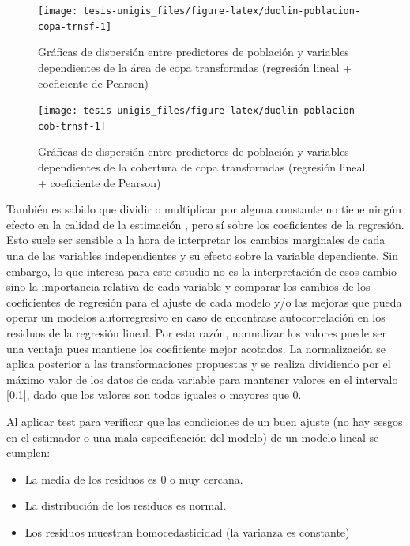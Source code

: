 \documentclass[12pt,]{book}
\providecommand{\tightlist}{%
  \setlength{\itemsep}{0pt}\setlength{\parskip}{0pt}}
\begin{document}
\begin{figure}
\texttt{[image: tesis-unigis\_files/figure-latex/duolin-poblacion-copa-trnsf-1]} \caption{Gráficas de dispersión entre predictores de población y variables dependientes de la área de copa transformdas (regresión lineal + coeficiente de Pearson)}\label{fig:duolin-poblacion-copa-trnsf}
\end{figure}

\begin{figure}
\texttt{[image: tesis-unigis\_files/figure-latex/duolin-poblacion-cob-trnsf-1]} \caption{Gráficas de dispersión entre predictores de población y variables dependientes de la cobertura de copa transformdas (regresión lineal + coeficiente de Pearson)}\label{fig:duolin-poblacion-cob-trnsf}
\end{figure}

También es sabido que dividir o multiplicar por alguna constante no
tiene ningún efecto en la calidad de la estimación , pero sí sobre los
coeficientes de la regresión. Esto suele ser sensible a la hora de
interpretar los cambios marginales de cada una de las variables
independientes y su efecto sobre la variable dependiente. Sin embargo,
lo que interesa para este estudio no es la interpretación de esos cambio
sino la importancia relativa de cada variable y comparar los cambios de
los coeficientes de regresión para el ajuste de cada modelo y/o las
mejoras que pueda operar un modelos autorregresivo en caso de encontrase
autocorrelación en los residuos de la regresión lineal. Por esta razón,
normalizar los valores puede ser una ventaja pues mantiene los
coeficiente mejor acotados. La normalización se aplica posterior a las
transformaciones propuestas y se realiza dividiendo por el máximo valor
de los datos de cada variable para mantener valores en el intervalo
{[}0,1{]}, dado que los valores son todos iguales o mayores que 0.

Al aplicar test para verificar que las condiciones de un buen ajuste (no
hay sesgos en el estimador o una mala especificación del modelo) de un
modelo lineal se cumplen:

\begin{itemize}
\tightlist
\item
  La media de los residuos es 0 o muy cercana.
\item
  La distribución de los residuos es normal.
\item
  Los residuos muestran homocedasticidad (la varianza es constante)
\end{itemize}
\end{document}

